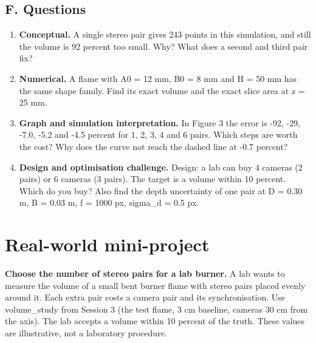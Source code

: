 \documentclass[11pt,a4paper]{article}
\begin{document}
\subsection*{F. Questions}
\begin{enumerate}[nosep]
\item \textbf{Conceptual.} A single stereo pair gives 243 points in this simulation, and still the volume is 92 percent too small. Why? What does a second and third pair fix?
\item \textbf{Numerical.} A flame with A0 = 12 mm, B0 = 8 mm and H = 50 mm has the same shape family. Find its exact volume and the exact slice area at z = 25 mm.
\item \textbf{Graph and simulation interpretation.} In Figure 3 the error is -92, -29, -7.0, -5.2 and -4.5 percent for 1, 2, 3, 4 and 6 pairs. Which steps are worth the cost? Why does the curve not reach the dashed line at -0.7 percent?
\item \textbf{Design and optimisation challenge.} Design: a lab can buy 4 cameras (2 pairs) or 6 cameras (3 pairs). The target is a volume within 10 percent. Which do you buy? Also find the depth uncertainty of one pair at D = 0.30 m, B = 0.03 m, f = 1000 px, sigma\_d = 0.5 px.
\end{enumerate}

\section{Real-world mini-project}
\textbf{Choose the number of stereo pairs for a lab burner.} A lab wants to measure the volume of a small bent burner flame with stereo pairs placed evenly around it. Each extra pair costs a camera pair and its synchronisation. Use volume\_study from Session 3 (the test flame, 3 cm baseline, cameras 30 cm from the axis). The lab accepts a volume within 10 percent of the truth. These values are illustrative, not a laboratory procedure.
\end{document}
